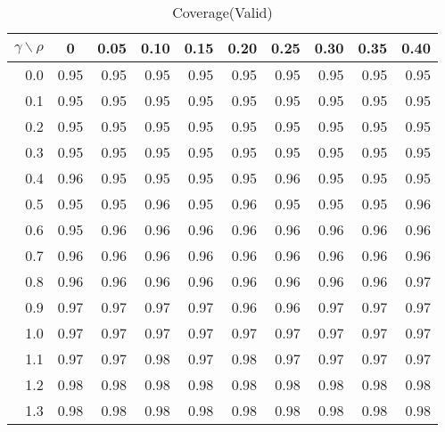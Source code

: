 \documentclass[12pt]{article}
\begin{document}
%
\begin{table}[!tbp]
\caption{Coverage(Valid)}
 \begin{center}
 \begin{tabular}{r|rrrrrrrrr}\hline\hline
\multicolumn{1}{c|}{$\gamma\backslash\rho$}&\multicolumn{1}{c}{0}&\multicolumn{1}{c}{0.05}&\multicolumn{1}{c}{0.10}&\multicolumn{1}{c}{0.15}&\multicolumn{1}{c}{0.20}&\multicolumn{1}{c}{0.25}&\multicolumn{1}{c}{0.30}&\multicolumn{1}{c}{0.35}&\multicolumn{1}{c}{0.40}\tabularnewline
\hline

0.0&0.95&0.95&0.95&0.95&0.95&0.95&0.95&0.95&0.95\tabularnewline
0.1&0.95&0.95&0.95&0.95&0.95&0.95&0.95&0.95&0.95\tabularnewline
0.2&0.95&0.95&0.95&0.95&0.95&0.95&0.95&0.95&0.95\tabularnewline
0.3&0.95&0.95&0.95&0.95&0.95&0.95&0.95&0.95&0.95\tabularnewline
0.4&0.96&0.95&0.95&0.95&0.95&0.96&0.95&0.95&0.95\tabularnewline
0.5&0.95&0.95&0.96&0.95&0.96&0.95&0.95&0.95&0.96\tabularnewline
0.6&0.95&0.96&0.96&0.96&0.96&0.96&0.96&0.96&0.96\tabularnewline
0.7&0.96&0.96&0.96&0.96&0.96&0.96&0.96&0.96&0.96\tabularnewline
0.8&0.96&0.96&0.96&0.96&0.96&0.96&0.96&0.96&0.97\tabularnewline
0.9&0.97&0.97&0.97&0.97&0.96&0.96&0.97&0.97&0.97\tabularnewline
1.0&0.97&0.97&0.97&0.97&0.97&0.97&0.97&0.97&0.97\tabularnewline
1.1&0.97&0.97&0.98&0.97&0.98&0.97&0.97&0.97&0.97\tabularnewline
1.2&0.98&0.98&0.98&0.98&0.98&0.98&0.98&0.98&0.98\tabularnewline
1.3&0.98&0.98&0.98&0.98&0.98&0.98&0.98&0.98&0.98\tabularnewline
\hline
\end{tabular}

\end{center}

\end{table}
\end{document}
